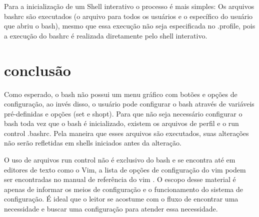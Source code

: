 \documentclass[oneside, 11 pt]{article}
\begin{document}
	Para a inicialização de um Shell interativo o processo é mais simples: Os arquivos bashrc são executados (o arquivo para todos os usuários e o específico do usuário que abriu o bash), mesmo que essa execução não seja especificada no .profile, pois a execução do bashrc é realizada diretamente pelo shell interativo.
	
	\section{conclusão}
	Como esperado, o bash não possui um menu gráfico com botões e opções de configuração, ao invés disso, o usuário pode configurar o bash através de variáveis pré-definidas e opções (set e shopt). Para que não seja necessário configurar o bash toda vez que o bash é inicializado, existem os arquivos de perfil e o run control .bashrc. Pela maneira que esses arquivos são executados, suas alterações não serão refletidas em shells iniciados antes da alteração.
	
	O uso de arquivos run control não é exclusivo do bash e se encontra até em editores de texto como o Vim, a lista de opções de configuração do vim podem ser encontradas no manual de referência do vim \cite{viman}. O escopo desse material é apenas de informar os meios de configuração e o funcionamento do sistema de configuração. É ideal que o leitor se acostume com o fluxo de encontrar uma necessidade e buscar uma configuração para atender essa necessidade.




\end{document}
